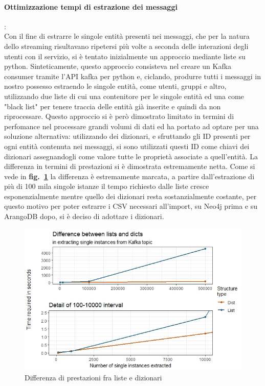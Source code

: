 \documentclass[fleqn,10pt]{SelfArx} %
\begin{document}
{{\paragraph{Ottimizzazione tempi di estrazione dei messaggi}:  \\ Con il fine di estrarre le singole entità presenti nei messaggi, che per la natura dello streaming risultavano ripetersi più volte a seconda delle interazioni degli utenti con il servizio, si è tentato inizialmente un approccio mediante liste su python. 
Sinteticamente, questo approccio consisteva nel creare un Kafka consumer tramite l'API kafka per python e, ciclando, produrre tutti i messaggi in nostro possesso estraendo le singole entità, come utenti, gruppi e altro, utilizzando due liste di cui una contenitore per le singole entità ed una come "black list" per tenere traccia delle entità già inserite e quindi da non riprocessare. 
Questo approccio si è però dimostrato limitato in termini di perfomance nel processare grandi volumi di dati ed ha portato ad optare per una soluzione alternativa: utilizzando dei dizionari, e sfruttando gli ID presenti per ogni entità contenuta nei messaggi, si sono utilizzati questi ID come chiavi dei dizionari assegnandogli come valore tutte le proprietà associate a quell'entità. 
La differenza in termini di prestazioni si è dimostrata estremamente netta. 
Come si vede in \textbf{fig.~\ref{plot_lists_dicts}} la differenza è estremamente marcata, a partire dall'estrazione di più di 100 mila singole istanze il tempo richiesto dalle liste cresce esponenzialmente mentre quello dei dizionari resta sostanzialmente costante, per questo motivo per poter estrarre i CSV necessari all'import, su Neo4j prima e su ArangoDB dopo, si è deciso di adottare i dizionari.
\begin{figure}
\centering
\includegraphics[scale=0.54]{viz_benchmark_lists_dicts.jpeg}
\caption{\label{plot_lists_dicts} Differenza di prestazioni fra liste e dizionari}
\end{figure}
}}
\end{document}
